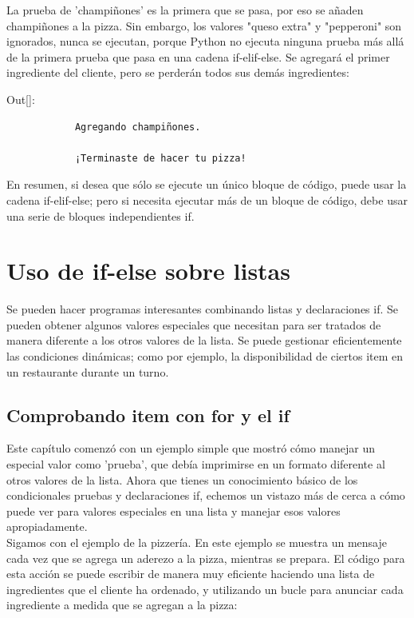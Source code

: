 La prueba de  'champiñones' es la primera que se pasa, por eso se añaden champiñones
a la pizza. Sin embargo, los valores "queso extra" y "pepperoni" son ignorados, nunca se
ejecutan, porque Python no ejecuta ninguna prueba más allá de la primera prueba que
pasa en una cadena {\ttfamily if-elif-else}. Se agregará el primer ingrediente del cliente,
pero se perderán todos sus demás ingredientes:\vspace{0.09cm}


{\ttfamily\scriptsize\noindent Out[]:\vspace{-0.292cm}	
	{\color{blue} 	
		\begin{verbatim}
			Agregando champiñones.
			
			¡Terminaste de hacer tu pizza!
		\end{verbatim}
}} 


En resumen, si desea que sólo se ejecute un único bloque de código, puede usar la cadena {\ttfamily if-elif-else}; pero si necesita ejecutar más de un bloque de código, debe usar una serie de bloques independientes {\ttfamily if}.


\section{Uso de {\ttfamily if-else} sobre listas}

Se pueden hacer programas interesantes combinando listas y declaraciones {\ttfamily if}. Se pueden obtener algunos valores especiales que necesitan para ser tratados de manera diferente a los otros valores de la lista. Se puede gestionar eficientemente las condiciones dinámicas; como por ejemplo, la disponibilidad de ciertos item en un restaurante durante un turno.  


\subsection{Comprobando item  con {\ttfamily for} y el {\ttfamily if}}

Este capítulo comenzó con un ejemplo simple que mostró cómo manejar un especial
valor como 'prueba', que debía imprimirse en un formato diferente al
otros valores de la lista. Ahora que tienes un conocimiento básico de los  condicionales
pruebas y declaraciones {\ttfamily if}, echemos un vistazo más de cerca a cómo puede ver
para valores especiales en una lista y manejar esos valores apropiadamente.\\

Sigamos con el ejemplo de la pizzería. En este ejemplo se muestra un mensaje 
cada vez que se agrega un aderezo a la pizza, mientras se prepara. El código
para esta acción se puede escribir de manera muy eficiente haciendo una lista de ingredientes que
el cliente ha ordenado, y utilizando un bucle para anunciar cada ingrediente a medida que se
agregan a la pizza: 

